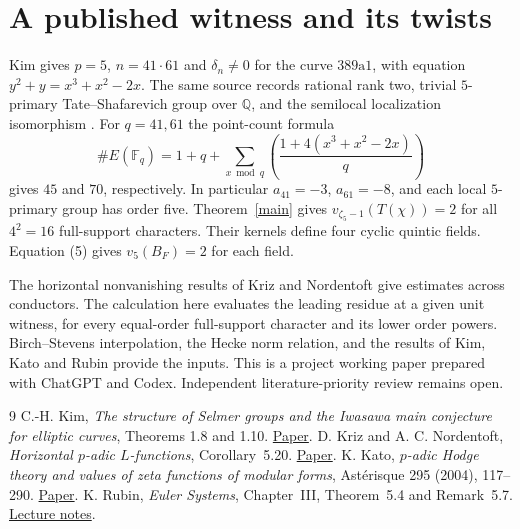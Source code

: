 \documentclass[11pt]{article}
\newcommand{\Q}{\mathbb Q}
\newcommand{\F}{\mathbb F}
\begin{document}
\section{A published witness and its twists}
Kim gives $p=5$, $n=41\cdot61$ and $\delta_n\ne0$ for the curve
$389\mathrm{a}1$, with equation $y^2+y=x^3+x^2-2x$.
The same source records rational rank two, trivial $5$-primary
Tate--Shafarevich group over $\Q$, and the semilocal localization
isomorphism \cite[\S8, example (1)]{Kim}.
For $q=41,61$ the point-count formula
\[
 \#E(\F_q)=1+q+\sum_{x\bmod q}
       \left(\frac{1+4(x^3+x^2-2x)}{q}\right)
\]
gives $45$ and $70$, respectively. In particular $a_{41}=-3$,
$a_{61}=-8$, and each local $5$-primary group has order five.
Theorem~\ref{main} gives $v_{\zeta_5-1}(T(\chi))=2$ for all
$4^2=16$ full-support characters. Their kernels define four cyclic
quintic fields. Equation (5) gives $v_5(B_F)=2$ for each field.


The horizontal nonvanishing results of Kriz and Nordentoft
\cite[Cor.~5.20]{KN} give estimates across conductors. The
calculation here evaluates the leading residue at a given unit
witness, for every equal-order full-support character and its lower
order powers. Birch--Stevens interpolation, the Hecke norm
relation, and the results of Kim, Kato and Rubin provide the inputs.
This is a project working paper prepared with ChatGPT and Codex.
Independent literature-priority review remains open.
\begin{thebibliography}{9}
 C.-H. Kim, \emph{The structure of Selmer groups and
the Iwasawa main conjecture for elliptic curves}, Theorems 1.8 and 1.10.
\href{https://preprint.press.jhu.edu/ajm/sites/default/files/AJM-kim.pdf}{Paper}.
 D. Kriz and A. C. Nordentoft, \emph{Horizontal $p$-adic
$L$-functions}, Corollary~5.20.
\href{https://arxiv.org/abs/2310.20678}{Paper}.
 K. Kato, \emph{$p$-adic Hodge theory and values of zeta
functions of modular forms}, Ast\'erisque 295 (2004), 117--290.
\href{https://www.numdam.org/item/AST_2004__295__117_0/}{Paper}.
 K. Rubin, \emph{Euler Systems}, Chapter~III,
Theorem~5.4 and Remark~5.7. \href{https://swc-math.github.io/notes/files/99RubinES.pdf}{Lecture notes}.
\end{thebibliography}
\end{document}
